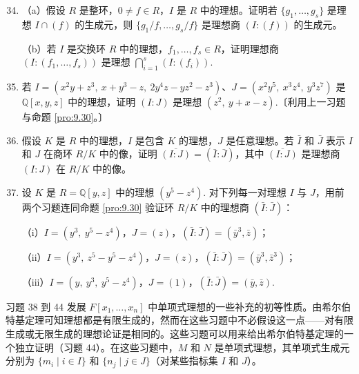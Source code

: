 \begin{enumerate}
\setcounter{enumi}{33}
\item （a）假设 \(R\) 是整环，\(0 \neq f \in R\)，\(I\) 是 \(R\) 中的理想。证明若 \(\{g_1, \ldots, g_s\}\) 是理想 \(I \cap (f)\) 的生成元，则 \(\{g_1/f, \ldots, g_s/f\}\) 是理想商 \((I : (f))\) 的生成元。

（b）若 \(I\) 是交换环 \(R\) 中的理想，\(f_1, \ldots, f_s \in R\)，证明理想商 \((I : (f_1, \ldots, f_s))\) 是理想 \(\bigcap_{i=1}^s (I : (f_i))\).

\item 若 \(I = (x^2y+z^3,\ x+y^3-z,\ 2y^4z-yz^2-z^3)\)、\(J = (x^2y^5,\ x^3z^4,\ y^3z^7)\) 是 \(\mathbb{Q}[x, y, z]\) 中的理想，证明 \((I : J)\) 是理想 \((z^2,\ y+x-z)\).〔利用上一习题与命题 \ref{pro:9.30}。〕

\item 假设 \(K\) 是 \(R\) 中的理想，\(I\) 是包含 \(K\) 的理想，\(J\) 是任意理想。若 \(\bar{I}\) 和 \(\bar{J}\) 表示 \(I\) 和 \(J\) 在商环 \(R/K\) 中的像，证明 \(\overline{(I : J)} = (\bar{I} : \bar{J})\)，其中 \(\overline{(I : J)}\) 是理想商 \((I : J)\) 在 \(R/K\) 中的像。

\item 设 \(K\) 是 \(R = \mathbb{Q}[y, z]\) 中的理想 \((y^5-z^4)\). 对下列每一对理想 \(I\) 与 \(J\)，用前两个习题连同命题 \ref{pro:9.30} 验证环 \(R/K\) 中的理想商 \((\bar{I} : \bar{J})\)：

（i）\(I = (y^3,\ y^5-z^4)\)，\(J = (z)\)，\((\bar{I} : \bar{J}) = (\bar{y}^3, \bar{z})\)；

（ii）\(I = (y^3,\ z^5-y^5-z^4)\)，\(J = (z)\)，\((\bar{I} : \bar{J}) = (\bar{y}^3, \bar{z}^3)\)；

（iii）\(I = (y,\ y^3,\ y^5-z^4)\)，\(J = (1)\)，\((\bar{I} : \bar{J}) = (\bar{y}, \bar{z})\).
\end{enumerate}

\noindent 习题 38 到 44 发展 \(F[x_1, \ldots, x_n]\) 中单项式理想的一些补充的初等性质。由希尔伯特基定理可知理想都是有限生成的，然而在这些习题中不必假设这一点——对有限生成或无限生成的理想论证是相同的。这些习题可以用来给出希尔伯特基定理的一个独立证明（习题 44）。在这些习题中，\(M\) 和 \(N\) 是单项式理想，其单项式生成元分别为 \(\{m_i \mid i \in I\}\) 和 \(\{n_j \mid j \in J\}\)（对某些指标集 \(I\) 和 \(J\)）。

